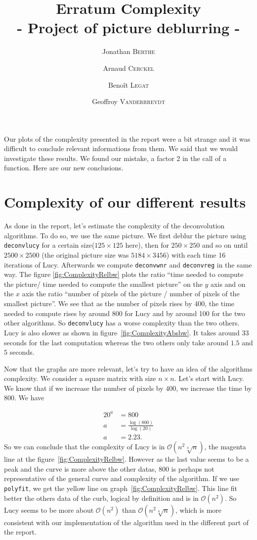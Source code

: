 \documentclass{article}
\title{ \textbf{Erratum Complexity} \\ - Project of picture deblurring - }
\author{Jonathan \textsc{Berthe} \and Arnaud \textsc{Cerckel} \and Benoît \textsc{Legat} \and Geoffroy \textsc{Vanderrreydt}}
\begin{document}
\maketitle

Our plots of the complexity presented in the report were a bit strange and it was difficult to conclude relevant informations from them. We said that we would investigate these results.  We found our mistake, a factor 2 in the call of a function. Here are our new conclusions.  

\section{Complexity of our different results}


As done in the report, let's estimate the complexity of the deconvolution algorithms. To do so, we use the same picture. We first deblur the picture using \texttt{deconvlucy} for a certain size($125 \times 125$ here), then for $250 \times 250$ and so on until $2500 \times 2500$ (the original picture  size was $5184 \times 3456$) with each time 16 iterations of Lucy. Afterwards we compute  \texttt{deconvwnr} and \texttt{deconvreg} in the same way. The figure \ref{fig:ComplexityRelbw} plots the ratio ``time needed to compute the picture/ time needed to compute the smallest picture'' on the $y$ axis and on the $x$ axis the ratio ``number of pixels of the picture / number of pixels of the smallest picture''. We see that as the number of pixels rises by 400, the time needed to compute rises by around 800 for Lucy and by around 100 for the two other algorithms. So \texttt{deconvlucy} has a worse complexity than the two others. Lucy is also slower as shown in figure~\ref{fig:ComplexityAbsbw}. It takes around $33$ seconds for the last computation whereas the two others only take around $1.5$ and $5$ seconds.

Now that the graphs are more relevant, let's try to have an idea of the algorithms complexity. We consider a square matrix with size $n \times n$. Let's start with Lucy. We know that if we increase the number of pixels by $400$, we increase the time by $800$. We have 

\begin{align*}
20^a &= 800\\
a &= \frac{\log(800)}{\log(20)}\\
a &= 2.23.
\end{align*} 
So we can conclude that the complexity of Lucy is in $\mathcal{O}(n^2\sqrt[4]{n})$, the magenta line at the figure~\ref{fig:ComplexityRelbw}. However as the last value seems to be a peak and the curve is more above the other datas, $800$ is perhaps not representative of the general curve and complexity of the algorithm. If we use \texttt{polyfit}, we get the yellow line on graph~\ref{fig:ComplexityRelbw}. This line fit better the others data of the curb, logical by definition and is in $\mathcal{O}(n^2)$. So Lucy seems to be more about $\mathcal{O}(n^2)$ than $\mathcal{O}(n^2\sqrt[4]{n})$, which is more consistent with our implementation of the algorithm used in the different part of the report.  
\end{document}
